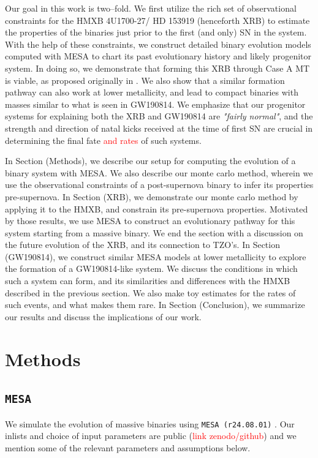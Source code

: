 \documentclass[linenumbers,trackchanges,twocolumn]{aastex701}
\newcommand{\red}{\textcolor{red}}
\begin{document}
Our goal in this work is two--fold. We first utilize the rich set of observational constraints for the HMXB 4U1700-27/ HD 153919 (henceforth XRB) to estimate the properties of the binaries just prior to the first (and only) SN in the system. With the help of these constraints, we construct detailed binary evolution models computed with MESA to chart its past evolutionary history and likely progenitor system. In doing so, we demonstrate that forming this XRB through Case A MT is viable, as proposed originally in \citep{2021A&A...655A..31V}. We also show that a similar formation pathway can also work at lower metallicity, and lead to compact binaries with masses similar to what is seen in GW190814. We emphasize that our progenitor systems for explaining both the XRB and GW190814 are \textit{"fairly normal"}, and the strength and direction of natal kicks received at the time of first SN are crucial in determining the final fate \red{and rates} of such systems.

In Section (Methods), we describe our setup for computing the evolution of a binary system with MESA. We also describe our monte carlo method, wherein we use the observational constraints of a post-supernova binary to infer its properties pre-supernova. In Section (XRB), we demonstrate our monte carlo method by applying it to the HMXB, and constrain its pre-supernova properties. Motivated by those results, we use MESA to construct an evolutionary pathway for this system starting from a massive binary. We end the section with a discussion on the future evolution of the XRB, and its connection to TZO's. In Section (GW190814), we construct similar MESA models at lower metallicity to explore the formation of a GW190814-like system. We discuss the conditions in which such a system can form, and its similarities and differences with the HMXB described in the previous section. We also make toy estimates for the rates of such events, and what makes them rare. In Section (Conclusion), we summarize our results and discuss the implications of our work.

\section{Methods} \label{sec:methods}

\subsection{\texttt{MESA}}

We simulate the evolution of massive binaries using \texttt{MESA (r24.08.01)} \citep{2011ApJS..192....3P,2013ApJS..208....4P,2015ApJS..220...15P,2018ApJS..234...34P,2019ApJS..243...10P,2023ApJS..265...15J}. Our inlists and choice of input parameters are public (\red{link zenodo/github}) and we mention some of the relevant parameters and assumptions below.
\end{document}
